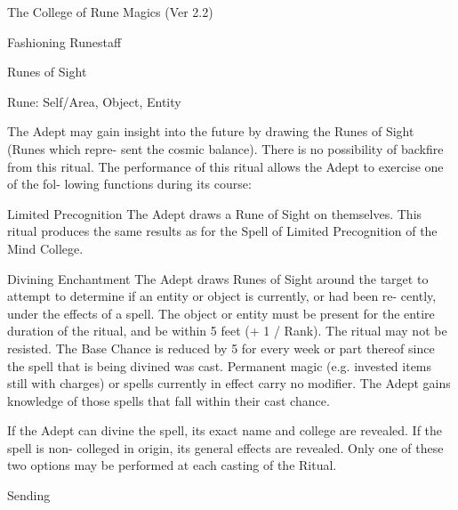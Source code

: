 \begin{Chapter}{The College of Rune Magics (Ver 2.2)}
\begin{ritual}[Q-1]{Fashioning Runestaff }
\begin{effects}
\end{effects}
\end{ritual}

\begin{ritual}[Q-2]{Runes of Sight }

Rune: Self/Area, Object, Entity 
\begin{effects}
The Adept may gain insight into the future 
by drawing the Runes of Sight (Runes which repre-
sent the cosmic balance). There is no possibility of 
backfire  from  this  ritual.  The  performance  of  this 
ritual  allows  the  Adept  to  exercise  one  of  the  fol-
lowing functions during its course: 

Limited Precognition The Adept draws a Rune of 
Sight on themselves. This ritual produces the same 
results  as  for  the  Spell  of  Limited  Precognition  of 
the Mind College. 

Divining Enchantment The Adept draws Runes of 
Sight  around  the  target  to  attempt  to  determine  if 
an  entity  or  object  is  currently,  or  had  been  re-
cently,  under  the  effects  of  a  spell.  The  object  or 
entity must be present for the entire duration of the 
ritual, and be within 5 feet (+ 1 / Rank). The ritual 
may  not  be  resisted.  The  Base  Chance  is  reduced 
by 5 for every  week or part thereof since the spell 
that  is  being  divined  was  cast.  Permanent  magic 
(e.g.  invested  items  still  with  charges)  or  spells 
currently  in  effect  carry  no  modifier.  The  Adept 
gains  knowledge  of  those  spells  that  fall  within 
their cast chance. 

If  the  Adept  can  divine  the  spell,  its  exact  name 
and  college  are  revealed.  If  the  spell  is  non-
colleged  in  origin,  its  general  effects  are  revealed. 
Only one of these two options may be performed at 
each casting of the Ritual. 

\end{effects}
\end{ritual}

\begin{ritual}[Q-3]{Sending }


\end{ritual}
\end{Chapter}
